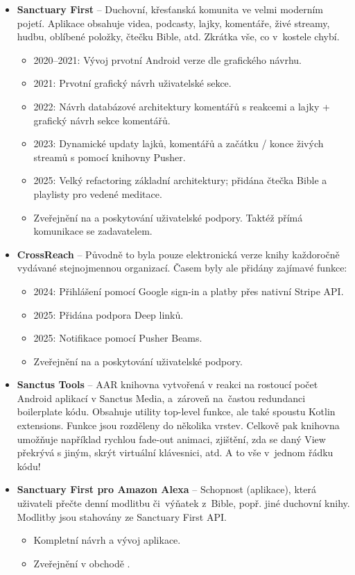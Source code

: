 \documentclass[11pt,a4paper,sans]{moderncv}
\begin{document}
{\begin{itemize}
\begin{itemize}
	\end{itemize}
	\item \textbf{Sanctuary First} -- Duchovní, křesťanská komunita ve velmi moderním pojetí. Aplikace obsahuje videa, podcasty, lajky, komentáře, živé streamy, hudbu, oblíbené položky, čtečku Bible, atd. Zkrátka vše, co v~kostele chybí.
	\begin{itemize}
		\item 2020--2021: Vývoj prvotní Android verze dle grafického návrhu.
		\item 2021: Prvotní grafický návrh uživatelské sekce.
		\item 2022: Návrh databázové architektury komentářů s reakcemi a lajky + grafický návrh sekce komentářů.
		\item 2023: Dynamické updaty lajků, komentářů a začátku / konce živých streamů s pomocí knihovny Pusher.
		\item 2025: Velký refactoring základní architektury; přidána čtečka Bible a playlisty pro vedené meditace.
		\item Zveřejnění na  a poskytování uživatelské podpory. Taktéž přímá komunikace se zadavatelem.
	\end{itemize}
	\item \textbf{CrossReach} -- Původně to byla pouze elektronická verze knihy každoročně vydávané
stejnojmennou organizací. Časem byly ale přidány zajímavé funkce:
	\begin{itemize}
		\item 2024: Přihlášení pomocí Google sign-in a platby přes nativní Stripe API.
		\item 2025: Přidána podpora Deep linků.
		\item 2025: Notifikace pomocí Pusher Beams.
		\item Zveřejnění na  a poskytování uživatelské podpory.
	\end{itemize}
	\item \textbf{Sanctus Tools} -- AAR knihovna vytvořená v reakci na rostoucí počet Android aplikací
v Sanctus Media, a~zároveň na~častou redundanci boilerplate kódu. Obsahuje utility
top-level funkce, ale také spoustu Kotlin extensions. Funkce jsou rozděleny do několika
vrstev. Celkově pak knihovna umožňuje například rychlou fade-out animaci, zjištění,
zda se daný View překrývá s jiným, skrýt virtuální klávesnici, atd. A to vše v~jednom
řádku kódu!
	\item \textbf{Sanctuary First pro Amazon Alexa} -- Schopnost (aplikace), která uživateli přečte
denní modlitbu či~výňatek z~Bible, popř. jiné duchovní knihy. Modlitby jsou stahovány
ze Sanctuary First API.
	\begin{itemize}
		\item Kompletní návrh a vývoj aplikace.
		\item Zveřejnění v obchodě .
	\end{itemize}
\end{itemize}
}
\end{document}
